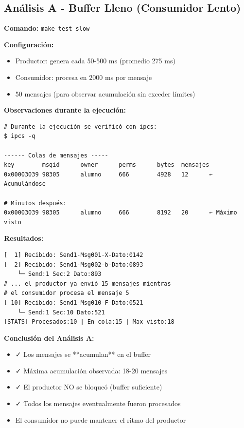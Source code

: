 \documentclass[10pt]{article}
\begin{document}
\subsection{Análisis A - Buffer Lleno (Consumidor Lento)}

\textbf{Comando:} \texttt{make test-slow}

\textbf{Configuración:}
\begin{itemize}
  \item Productor: genera cada 50-500 ms (promedio 275 ms)
  \item Consumidor: procesa en 2000 ms por mensaje
  \item 50 mensajes (para observar acumulación sin exceder límites)
\end{itemize}

\textbf{Observaciones durante la ejecución:}
\begin{verbatim}
# Durante la ejecución se verificó con ipcs:
$ ipcs -q

------ Colas de mensajes -----
key        msqid      owner      perms      bytes  mensajes
0x00003039 98305      alumno     666        4928   12      ← Acumulándose

# Minutos después:
0x00003039 98305      alumno     666        8192   20      ← Máximo visto
\end{verbatim}

\textbf{Resultados:}
\begin{lstlisting}[caption=Comportamiento del buffer (slow-receive.log)]
[  1] Recibido: Send1-Msg001-X-Dato:0142
[  2] Recibido: Send1-Msg002-b-Dato:0893
    └─ Send:1 Sec:2 Dato:893
# ... el productor ya envió 15 mensajes mientras
# el consumidor procesa el mensaje 5
[ 10] Recibido: Send1-Msg010-F-Dato:0521
    └─ Send:1 Sec:10 Dato:521
[STATS] Procesados:10 | En cola:15 | Max visto:18
\end{lstlisting}

\textbf{Conclusión del Análisis A:}
\begin{itemize}
  \item ✓ Los mensajes se **acumulan** en el buffer
  \item ✓ Máxima acumulación observada: 18-20 mensajes
  \item ✓ El productor NO se bloqueó (buffer suficiente)
  \item ✓ Todos los mensajes eventualmente fueron procesados
  \item El consumidor no puede mantener el ritmo del productor
\end{itemize}
\end{document}
